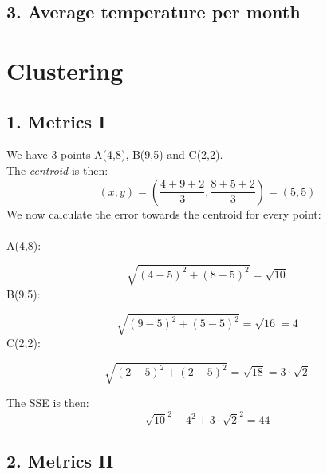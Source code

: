 \documentclass[11pt,a4paper]{article}
\begin{document}
\subsection*{3. Average temperature per month}


\pagebreak
\section*{Clustering}
\subsection*{1. Metrics I}
We have 3 points A(4,8), B(9,5) and C(2,2).\\
The \textit{centroid} is then:
$$ (x,y) = \left(\frac{4+9+2}{3},\frac{8+5+2}{3}\right)= (5,5)$$
We now calculate the error towards the centroid for every point:\\
\\
A(4,8):

$$\sqrt{(4-5)^2 + (8-5)^2} = \sqrt{10}$$
\noindent
B(9,5):

$$\sqrt{(9-5)^2 + (5-5)^2} = \sqrt{16} = 4$$
\noindent
C(2,2):

$$\sqrt{(2-5)^2 + (2-5)^2} = \sqrt{18} = 3\cdot\sqrt{2}$$

\noindent
The SSE is then:
$$\sqrt{10}^2 + 4^2 + 3\cdot\sqrt{2}^2 = 44$$

\subsection*{2. Metrics II}
\end{document}
